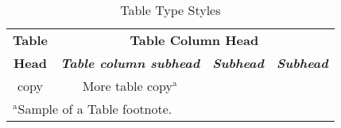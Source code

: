 \begin{table}[H]
    \caption{Table Type Styles}
    \begin{center}
        \begin{tabular}{|c|c|c|c|}
            \hline
            \textbf{Table}&\multicolumn{3}{|c|}{\textbf{Table Column Head}} \\
            \cline{2-4} 
            \textbf{Head} & \textbf{\textit{Table column subhead}}& \textbf{\textit{Subhead}}& \textbf{\textit{Subhead}} \\
            
            \hline
            copy& More table copy$^{\mathrm{a}}$& &  \\
            
            \hline
            \multicolumn{4}{l}{$^{\mathrm{a}}$Sample of a Table footnote.}
        \end{tabular}
        \label{tab1}
    \end{center}
\end{table}